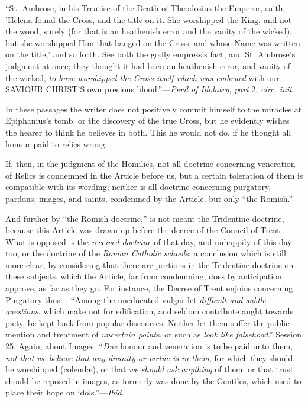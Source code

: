``St. Ambrose, in his Treatise of the Death of
Theodosius the Emperor, saith, 'Helena found the Cross, and the title
on it. She worshipped the King, and not the wood, surely (for that is
an heathenish error and the vanity of the wicked), but she worshipped
Him that hanged on the Cross, and whose Name was written on the
title,' and so forth. See both the godly empress's fact, and St.
Ambrose's judgment at once; they thought it had been an heathenish
error, and vanity of the wicked, \emph{to have worshipped the Cross
itself which was embrued} with our SAVIOUR
CHRIST'S own precious
blood.''—\emph{Peril of Idolatry, part} 2, \emph{circ. init}.

In these passages the writer does not positively commit himself to
the miracles at Epiphanius's tomb, or the discovery of the true Cross,
but he evidently wishes the hearer to think he believes in both. This
he would not do, if he thought all honour paid to relics wrong.

If, then, in the judgment of the Homilies, not all doctrine
concerning veneration of Relics is condemned in the Article before us,
but a certain toleration of them is compatible with its wording;
neither is all doctrine concerning purgatory, pardons, images, and
saints, condemned by the Article, but only ``the Romish.''

And further by ``the Romish doctrine,'' is not meant the
Tridentine doctrine, because this Article was drawn up before the
decree of the Council of Trent. What is opposed is the \emph{received
doctrine} of that day, and unhappily of this day too, or the
doctrine of the \emph{Roman Catholic} \emph{schools}; a
conclusion which is still more clear, by considering that there are
portions in the Tridentine doctrine on these subjects, which the
Article, far from condemning, does by anticipation approve, as far as
they go. For instance, the Decree of Trent enjoins concerning
Purgatory thus:—``Among the uneducated vulgar let \emph{difficult
and subtle questions}, which make not for edification, and seldom
contribute aught towards piety, be kept back from popular discourses.
Neither let them suffer the public mention and treatment of \emph{uncertain
points}, or such as \emph{look like falsehood}.'' Session 25.
Again, about Images: ``\emph{Due} honour and veneration is to be
paid unto them, \emph{not that we believe that any divinity or virtue is
in them}, for which they should be worshipped (colendæ), or that \emph{we
should ask anything} of them, or that trust should be reposed in
images, as formerly was done by the Gentiles, which used to place
their hope on idols.''—\emph{Ibid}.

